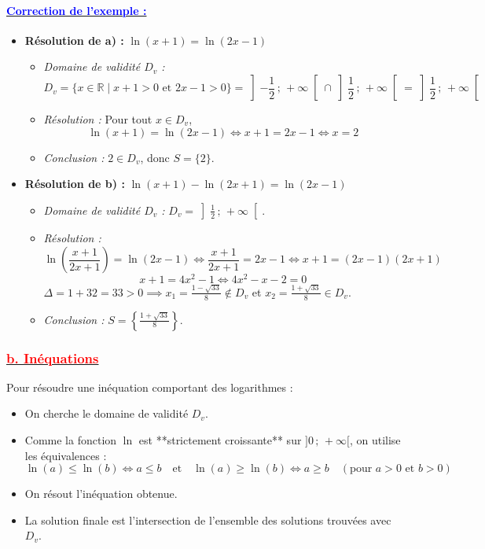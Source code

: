 \documentclass[12pt,a4paper]{article}
\newcounter{exemple}
\begin{document}
\paragraph{\underline{\textbf{\textcolor{blue}{Correction de l'exemple :}}}}
\begin{itemize}
    \item \textbf{Résolution de a) :} $\ln(x+1) = \ln(2x-1)$
    \begin{itemize}
        \item \textit{Domaine de validité $D_v$ :} 
        \[
        D_v = \{x \in \mathbb{R} \mid x+1 > 0 \text{ et } 2x-1 > 0\} = \left]-\frac{1}{2} \,;\, +\infty\right[ \cap \left]\frac{1}{2} \,;\, +\infty\right[ = \left]\frac{1}{2} \,;\, +\infty\right[
        \]
        \item \textit{Résolution :} Pour tout $x \in D_v$,
        \[
        \ln(x+1) = \ln(2x-1) \iff x+1 = 2x-1 \iff x = 2
        \]
        \item \textit{Conclusion :} $2 \in D_v$, donc $S = \{2\}$.
    \end{itemize}

    \item \textbf{Résolution de b) :} $\ln(x+1) - \ln(2x+1) = \ln(2x-1)$
    \begin{itemize}
        \item \textit{Domaine de validité $D_v$ :} $D_v = \left]\frac{1}{2} \,;\, +\infty\right[$.
        \item \textit{Résolution :} 
        \[
        \ln\left(\frac{x+1}{2x+1}\right) = \ln(2x-1) \iff \frac{x+1}{2x+1} = 2x-1 \iff x+1 = (2x-1)(2x+1)
        \]
        \[
        x+1 = 4x^2 - 1 \iff 4x^2 - x - 2 = 0
        \]
        $\Delta = 1 + 32 = 33 > 0 \implies x_1 = \frac{1-\sqrt{33}}{8} \notin D_v$ et $x_2 = \frac{1+\sqrt{33}}{8} \in D_v$.
        \item \textit{Conclusion :} $S = \left\{\frac{1+\sqrt{33}}{8}\right\}$.
    \end{itemize}
\end{itemize}

\vspace{0.5cm}

\subsubsection*{\underline{\textbf{\textcolor{red}{b. Inéquations}}}}

Pour résoudre une inéquation comportant des logarithmes :
\begin{itemize}
    \item On cherche le domaine de validité $D_v$.
    \item Comme la fonction $\ln$ est **strictement croissante** sur $]0\,;\,+\infty[$, on utilise les équivalences :
    \[
    \ln(a) \leq \ln(b) \iff a \leq b \quad \text{et} \quad \ln(a) \geq \ln(b) \iff a \geq b \quad (\text{pour } a>0 \text{ et } b>0)
    \]
    \item On résout l'inéquation obtenue.
    \item La solution finale est l'intersection de l'ensemble des solutions trouvées avec $D_v$.
\end{itemize}
\end{document}
